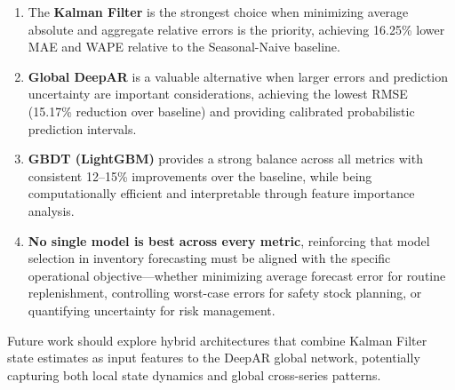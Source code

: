 \documentclass[conference]{IEEEtran}
\begin{document}
\begin{enumerate}
    \item The \textbf{Kalman Filter} is the strongest choice when minimizing average absolute and aggregate relative errors is the priority, achieving 16.25\% lower MAE and WAPE relative to the Seasonal-Naive baseline.

    \item \textbf{Global DeepAR} is a valuable alternative when larger errors and prediction uncertainty are important considerations, achieving the lowest RMSE (15.17\% reduction over baseline) and providing calibrated probabilistic prediction intervals.

    \item \textbf{GBDT (LightGBM)} provides a strong balance across all metrics with consistent 12--15\% improvements over the baseline, while being computationally efficient and interpretable through feature importance analysis.

    \item \textbf{No single model is best across every metric}, reinforcing that model selection in inventory forecasting must be aligned with the specific operational objective---whether minimizing average forecast error for routine replenishment, controlling worst-case errors for safety stock planning, or quantifying uncertainty for risk management.
\end{enumerate}

Future work should explore hybrid architectures that combine Kalman Filter state estimates as input features to the DeepAR global network, potentially capturing both local state dynamics and global cross-series patterns.
\end{document}
